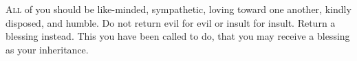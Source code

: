 
\lettrine{A}{ll} of you should be like-minded, sympathetic, loving toward one another, kindly disposed, and humble. Do not return evil for evil or insult for insult. Return a blessing instead. This you have been called to do, that you may receive a blessing as your inheritance.